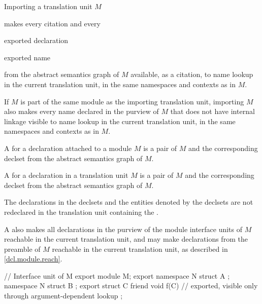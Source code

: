 \begin{std.txt}
  \alinea
  \begin{after}\color{addclr}
  Importing a translation unit $M$
  \end{after}
  makes every citation and every
  \begin{before}\color{addclr}
  exported declaration
  \end{before}
  \begin{after}\color{addclr}
  exported name
  \end{after}
  from the 
  abstract semantics graph of $M$ available, as a citation,
  to name lookup in
  the current translation unit, in the same namespaces and contexts
  as in $M$.
  \begin{after}\color{addclr}
  If $M$ is part of the same module as the importing translation unit,
  importing $M$ also makes every name declared in the purview of $M$
  that does not have internal linkage visible to name lookup
  in the current translation unit, in the same namespaces and contexts
  as in $M$.
  \end{after}
  \begin{before}\color{addclr}
  A  for a declaration attached to a module $M$ is a pair of
  $M$ and the corresponding declset from the abstract semantics graph 
  of $M$. 
  \end{before}
  \begin{after}\color{addclr}
  A  for a declaration in a translation unit $M$ is a pair of
  $M$ and the corresponding declset from the abstract semantics graph 
  of $M$. 
  \end{after}
  \enternote
  The declarations in the declsets and the entities denoted by the declsets
  are not redeclared in the translation unit
  containing the .
  \exitnote

  \begin{after}\color{addclr}
  \alinea
  \enternote
  A  also makes all
  declarations in the purview of the module interface units of $M$
  reachable in the current translation unit, and may make declarations
  from the preamble of $M$ reachable in the current translation
  unit, as described in \ref{dcl.module.reach}.
  \exitnote
  \end{after}
  \begin{example}
  \begin{Program}
     // Interface unit of M
     export module M;
     export namespace N {
        struct A { };
     }
     namespace N {
        struct B { };
        export struct C {
           friend void f(C) { }  // exported, visible only through argument-dependent lookup
        };
     }


\end{Program}
\end{example}
\end{std.txt}
